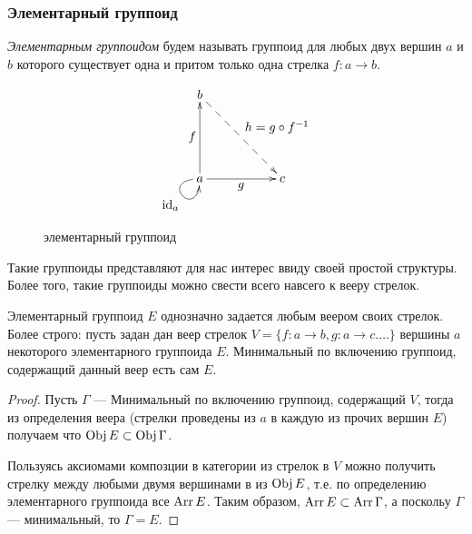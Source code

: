 \subsubsection{Элементарный группоид}

\begin{definition}
    \emph{Элементарным группоидом} будем называть группоид для любых двух 
    вершин $a$ и $b$ которого существует одна и притом только одна стрелка 
    $f: a \to b$.
\end{definition}

\begin{figure}[h]
    \centering
    \[\xymatrix{
        b \ar@{-->}[ddrr]^{\textstyle{h=g \circ f^{-1}}}                                    & &     \\
                                                                                            & &     \\
        a \ar@(l,d)[]_{\textstyle{\id_a}} \ar[uu]^{\textstyle{f}} \ar[rr]_{\textstyle{g}}   & & c
    }\]
    \caption{элементарный группоид}
    \label{cd_el_func}
\end{figure}

Такие группоиды представляют для нас интерес ввиду своей простой структуры. 
Более того, такие группоиды можно свести всего навсего к вееру стрелок.

\begin{statement}\label{st_veer}
    Элементарный группоид $E$ однозначно задается любым веером своих стрелок.\\
    Более строго: пусть задан дан веер стрелок $V = \{f : a \to b, g : a \to c. \ldots\}$ 
    вершины $a$ некоторого элементарного группоида $E$. Минимальный по 
    включению группоид, содержащий данный веер есть сам $E$.
\end{statement}

\begin{proof}
    Пусть $\Gamma$ --- Минимальный по включению группоид, содержащий $V$, тогда из 
    определения веера (стрелки проведены из $a$ в каждую из прочих вершин $E$) 
    получаем что $\operatorname*{Obj} E \subset \operatorname*{Obj} \Gamma$.

    Пользуясь аксиомами композции в категории из стрелок в $V$ можно получить 
    стрелку между любыми двумя вершинами в из $\operatorname*{Obj} E$, т.е. по определению 
    элементарного группоида все $\operatorname*{Arr} E$. Таким образом, $\operatorname*{Arr} E \subset 
    \operatorname*{Arr} \Gamma$, а поскольу $\Gamma$ --- минимальный, то $\Gamma = E$.
\end{proof}

